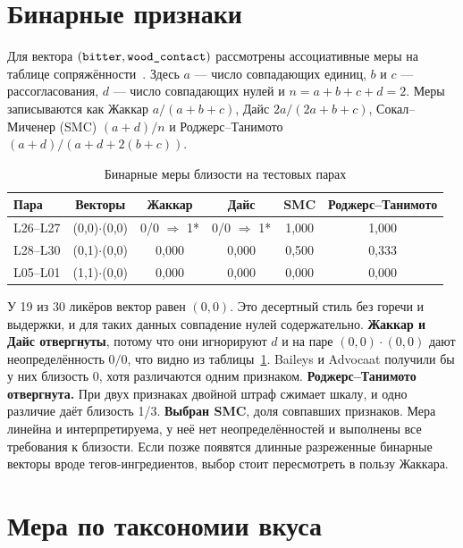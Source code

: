 \section{Бинарные признаки}

Для вектора $(\texttt{bitter}, \texttt{wood\_contact})$ рассмотрены ассоциативные меры на таблице сопряжённости~\cite{volkova2014}. Здесь $a$ --- число совпадающих единиц, $b$ и $c$ --- рассогласования, $d$ --- число совпадающих нулей и $n = a+b+c+d = 2$. Меры записываются как Жаккар $a/(a+b+c)$, Дайс $2a/(2a+b+c)$, Сокал--Миченер (SMC) $(a+d)/n$ и Роджерс--Танимото $(a+d)/(a+d+2(b+c))$.

\begin{table}[H]
	\centering
	\caption{Бинарные меры близости на тестовых парах}
	\label{tab:lr2_binary}
	\footnotesize
	\begin{tabular}{|l|c|c|c|c|c|}
		\hline
		Пара & Векторы & Жаккар & Дайс & SMC & Роджерс--Танимото \\ \hline
		L26--L27 & (0,0)$\cdot$(0,0) & 0/0 $\Rightarrow$ 1* & 0/0 $\Rightarrow$ 1* & 1,000 & 1,000 \\ \hline
		L28--L30 & (0,1)$\cdot$(0,0) & 0,000 & 0,000 & 0,500 & 0,333 \\ \hline
		L05--L01 & (1,1)$\cdot$(0,0) & 0,000 & 0,000 & 0,000 & 0,000 \\ \hline
	\end{tabular}
\end{table}

У 19 из 30 ликёров вектор равен $(0,0)$. Это десертный стиль без горечи и выдержки, и для таких данных совпадение нулей содержательно. \textbf{Жаккар и Дайс отвергнуты}, потому что они игнорируют $d$ и на паре $(0,0)\cdot(0,0)$ дают неопределённость $0/0$, что видно из таблицы~\ref{tab:lr2_binary}. Baileys и Advocaat получили бы у них близость 0, хотя различаются одним признаком. \textbf{Роджерс--Танимото отвергнута.} При двух признаках двойной штраф сжимает шкалу, и одно различие даёт близость 1/3. \textbf{Выбран SMC}, доля совпавших признаков. Мера линейна и интерпретируема, у неё нет неопределённостей и выполнены все требования к близости. Если позже появятся длинные разреженные бинарные векторы вроде тегов-ингредиентов, выбор стоит пересмотреть в пользу Жаккара.

\section{Мера по таксономии вкуса}
\label{sec:lr2_taxonomy}

